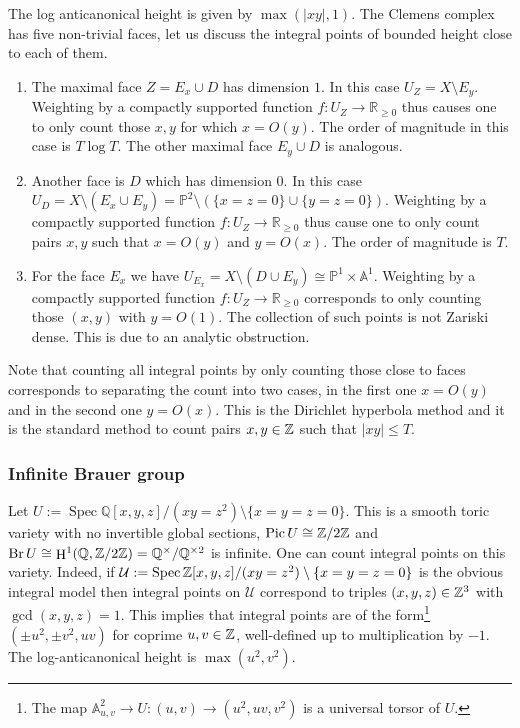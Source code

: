 \documentclass[a4paper,11pt,reqno]{amsart}
\newcommand{\Q}{\mathbb{Q}}
\newcommand{\R}{\mathbb{R}}
\newcommand{\A}{\mathbb{A}}
\newcommand{\Proj}{\mathbb{P}}
\DeclareMathOperator{\Pic}{Pic}
\DeclareMathOperator{\Spec}{Spec}
\DeclareMathOperator{\Br}{Br}
\DeclareMathOperator{\HH}{H}
\theoremstyle{definition}
\begin{document}
The log anticanonical height is given by $\max(|x y|, 1)$. The Clemens complex has five non-trivial faces, let us discuss the integral points of bounded height close to each of them.
\begin{enumerate}
	\item The maximal face $Z = E_x \cup D$ has dimension $1$. In this case $U_{Z} = X \setminus E_{y}$. Weighting by a compactly supported function $f:U_{Z} \to \R_{\geq 0}$ thus causes one to only count those $x,y$ for which $x = O(y)$. The order of magnitude in this case is $T \log T$. The other maximal face $E_y \cup D$ is analogous.
	\item Another face is $D$ which has dimension $0$. In this case $U_D = X \setminus (E_x \cup E_y) = \Proj^2 \setminus (\{x = z = 0\} \cup \{y = z = 0\})$. Weighting by a compactly supported function $f: U_Z \to \R_{\geq 0}$ thus cause one to only count pairs $x,y$ such that $x = O(y)$ and $y = O(x)$. The order of magnitude is $T$.
	\item For the face $E_x$ we have $U_{E_x} = X \setminus (D \cup E_y) \cong \Proj^1 \times \A^1$. Weighting by a compactly supported function $f: U_Z \to \R_{\geq 0}$ corresponds to only counting those $(x,y)$ with $y = O(1)$. The collection of such points is not Zariski dense. This is due to an analytic obstruction.
\end{enumerate}
	
Note that counting all integral points by only counting those close to faces corresponds to separating the count into two cases, in the first one $x = O(y)$ and in the second one $y = O(x)$. This is the Dirichlet hyperbola method and it is the standard method to count pairs $x,y \in \mathbb{Z}$ such that $|xy| \leq T$.
\subsubsection{Infinite Brauer group}\label{sec:Example with infinite Brauer group}
Let $U := \Spec \Q[x,y,z]/(xy = z^2) \setminus \{x = y = z = 0\}$. This is a smooth toric variety with no invertible global sections, $\Pic U \cong \Z /2 \Z$ and $\Br U \cong \HH^1(\Q, \Z/ 2 \Z) = \Q^{\times}/\Q^{\times 2}$ is infinite. One can count integral points on this variety. Indeed, if $\mathcal{U} := \Spec \Z[x,y,z]/(xy = z^2) \setminus \{x = y = z = 0\}$ is the obvious integral model then integral points on $\mathcal{U}$ correspond to triples $(x,y,z) \in \mathbb{Z}^3$ with $\gcd(x,y,z) = 1$. This implies that integral points are of the form\footnote{The map $\A^2_{u, v} \to U:(u,v) \to (u^2, uv, v^2)$ is a universal torsor of $U$.} $(\pm u^2, \pm v^2, uv)$ for coprime $u, v \in \mathbb{Z}$, well-defined up to multiplication by $-1$. The log-anticanonical height is $\max(u^2, v^2)$.
\end{document}
